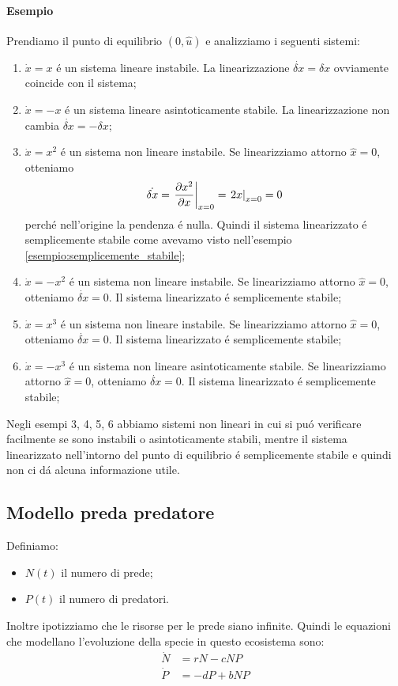 \documentclass[../main.tex]{subfiles}
\begin{document}
		\begin{mdframed}[style=Esempio]
			\paragraph{Esempio}
			Prendiamo il punto di equilibrio $ (0, \hat u) $ e analizziamo i seguenti sistemi:
			\begin{enumerate}
				\item
					$ \dot x = x $ \'e un sistema lineare instabile. La linearizzazione $ \dot{\delta x} = \delta x $ ovviamente coincide con il sistema;
				\item
					$ \dot x = -x $ \'e un sistema lineare asintoticamente stabile. La linearizzazione non cambia $ \dot{\delta x} = -\delta x $;
				\item
					$ \dot x = x^2 $ \'e un sistema non lineare instabile. Se linearizziamo attorno $ \hat x = 0 $, otteniamo
					\[
						\dot{\delta x} = \left. \frac{\partial x^2}{\partial x} \right|_{x=0} = \left. 2x \right|_{x=0} = 0
					\]
					perch\'e nell'origine la pendenza \'e nulla. Quindi il sistema linearizzato \'e semplicemente stabile come avevamo visto nell'esempio \ref{esempio:semplicemente_stabile};
				\item
					$ \dot x = -x^2 $ \'e un sistema non lineare instabile. Se linearizziamo attorno $ \hat x = 0 $, otteniamo $ \dot{\delta x} = 0 $. Il sistema linearizzato \'e semplicemente stabile;
				\item
					$ \dot x = x^3 $ \'e un sistema non lineare instabile. Se linearizziamo attorno $ \hat x = 0 $, otteniamo $ \dot{\delta x} = 0 $. Il sistema linearizzato \'e semplicemente stabile;
				\item
					$ \dot x = -x^3 $ \'e un sistema non lineare asintoticamente stabile. Se linearizziamo attorno $ \hat x = 0 $, otteniamo $ \dot{\delta x} = 0 $. Il sistema linearizzato \'e semplicemente stabile;
			\end{enumerate}
			Negli esempi 3, 4, 5, 6 abbiamo sistemi non lineari in cui si pu\'o verificare facilmente se sono instabili o asintoticamente stabili, mentre il sistema linearizzato nell'intorno del punto di equilibrio \'e semplicemente stabile e quindi non ci d\'a alcuna informazione utile.
		\end{mdframed}
		
	\subsection{Modello preda predatore}
		Definiamo:
		\begin{itemize}
			\item $ N(t) $ il numero di prede;
			\item $ P(t) $ il numero di predatori.
		\end{itemize}
		Inoltre ipotizziamo che le risorse per le prede siano infinite. Quindi le equazioni che modellano l'evoluzione della specie in questo ecosistema sono:
		\begin{align*}
			\dot N &= rN - cNP\\
			\dot P &= -dP + bNP
		\end{align*}
		
\end{document}

